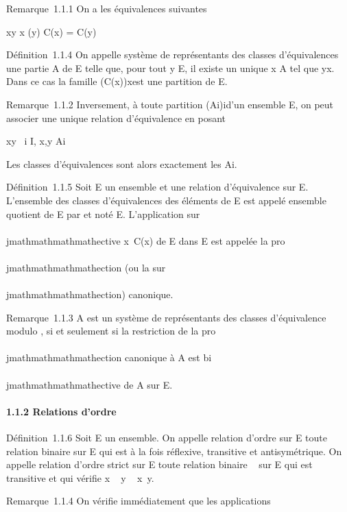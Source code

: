 Remarque~1.1.1 On a les équivalences suivantes

xy \Leftrightarrow x \inC(y) \mathrel\Leftrightarrow
C(x) = C(y)

Définition~1.1.4 On appelle système de représentants des classes
d'équivalences une partie A de E telle que, pour tout y \in E, il existe
un unique x \in A tel que yx. Dans ce cas la famille
\left (C(x)\right )x\inA est une
partition de E.

Remarque~1.1.2 Inversement, à toute partition
(Ai)i\inI d'un ensemble E, on peut associer une unique
relation d'équivalence en posant

xy \Leftrightarrow \exists~i \in I, x,y \in
Ai

Les classes d'équivalences sont alors exactement les Ai.

Définition~1.1.5 Soit E un ensemble et  une relation d'équivalence sur
E. L'ensemble des classes d'équivalences des éléments de E est appelé
ensemble quotient de E par  et noté E\diagup{}. L'application sur\\\\jmathmathmathmathective
x\mapsto~C(x) de E dans E\diagup{} est appelée la
pro\\\\jmathmathmathmathection (ou la sur\\\\jmathmathmathmathection) canonique.

Remarque~1.1.3 A est un système de représentants des classes
d'équivalence modulo , si et seulement si la restriction de la
pro\\\\jmathmathmathmathection canonique à A est bi\\\\jmathmathmathmathective de A sur E\diagup{}.

\paragraph{1.1.2 Relations d'ordre}

Définition~1.1.6 Soit E un ensemble. On appelle relation d'ordre sur E
toute relation binaire \leqslant sur E qui est à la fois réflexive, transitive
et antisymétrique. On appelle relation d'ordre strict sur E toute
relation binaire \prec~ sur E qui est transitive et qui vérifie x \prec~ y \rigtharrow~
x\neq~y.

Remarque~1.1.4 On vérifie immédiatement que les applications


